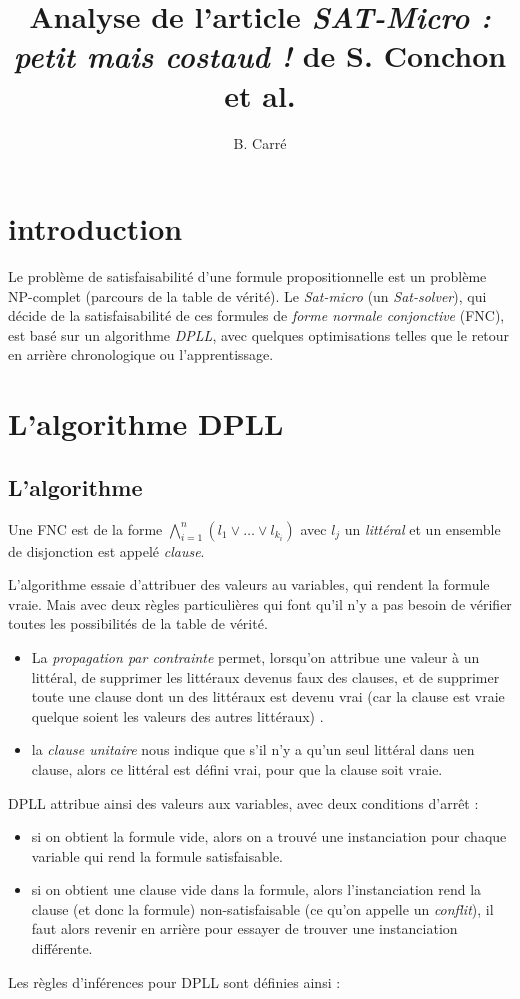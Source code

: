 \documentclass[a4paper, 10pt]{article}
\title{Analyse de l'article \emph{SAT-Micro : petit mais costaud !} de
  S. Conchon et al.}
\author{B. Carré}
\begin{document}
\maketitle


\section*{introduction}
Le problème de satisfaisabilité d'une formule propositionnelle est un
problème NP-complet (parcours de la table de vérité).
Le \emph{Sat-micro} (un \emph{Sat-solver}), qui décide de la
satisfaisabilité de ces formules de \emph{forme normale conjonctive}
(FNC), est basé sur un algorithme \emph{DPLL}, avec quelques
optimisations telles que le retour en arrière chronologique ou
l'apprentissage.

\section{L'algorithme DPLL}
\subsection{L'algorithme}
Une FNC est de la forme $\bigwedge^n_{i=1}(l_1\vee\ldots\vee l_{k_i})$
avec $l_j$ un \emph{littéral} et un ensemble de disjonction est appelé \emph{clause}.

L'algorithme essaie d'attribuer des valeurs au variables, qui rendent
la formule vraie. Mais avec deux règles particulières qui font qu'il
n'y a pas besoin de vérifier toutes les possibilités de la table de
vérité.
\begin{itemize}
\item La \emph{propagation par contrainte} permet, lorsqu'on attribue
  une valeur à un littéral, de supprimer les littéraux devenus faux des
  clauses, et de supprimer toute une clause dont un des littéraux est
  devenu vrai (car la clause est vraie quelque soient les valeurs des
  autres littéraux) .
\item la \emph{clause unitaire} nous indique que s'il n'y a qu'un seul
  littéral dans uen clause, alors ce littéral est défini vrai, pour que
  la clause soit vraie.
\end{itemize}
DPLL attribue ainsi des valeurs aux variables, avec deux
conditions d'arrêt :
\begin{itemize}
\item si on obtient la formule vide, alors on a trouvé une
  instanciation pour chaque variable qui rend la formule satisfaisable.
\item si on obtient une clause vide dans la formule, alors
  l'instanciation rend la clause (et donc la formule)
  non-satisfaisable (ce qu'on appelle un \emph{conflit}), il faut
  alors revenir en arrière pour essayer de trouver une instanciation
  différente.  
\end{itemize}
Les règles d'inférences pour DPLL sont définies ainsi :
\end{document}
